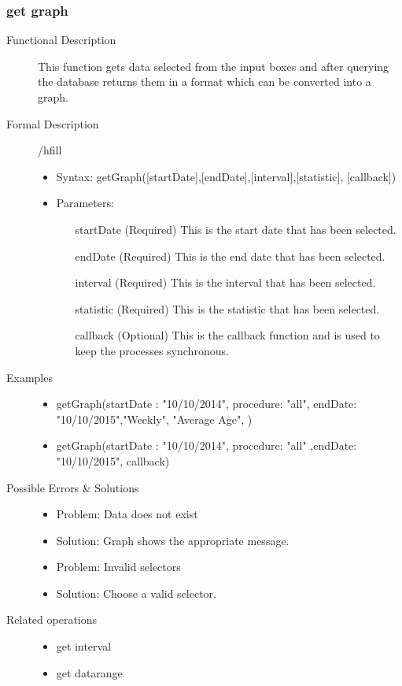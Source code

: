 \documentclass[14pt, a4paper]{article}
\begin{document}
\subsubsection{get graph}

\begin{description}
\item[Functional Description] This function gets data selected from the input boxes and after querying the database returns them in a format which can be converted into a graph.
\item[Formal Description]/hfill
\begin{itemize}
	\item Syntax: getGraph([startDate],[endDate],[interval],[statistic], [callback])\\
	\item Parameters:
		\begin{itemize}
			\item [startDate](Required) This is the start date that has been selected.
			\item [endDate](Required) This is the end date that has been selected.
			\item [interval](Required) This is the interval that has been selected.
			\item [statistic](Required) This is the statistic that has been selected.
			\item [callback](Optional) This is the callback function and is used to keep the processes synchronous.
		\end{itemize}
\end{itemize}
\item[Examples]\hfill
\begin{itemize}
	\item getGraph({startDate : "10/10/2014", procedure: "all", endDate: "10/10/2015"},"Weekly", "Average Age", )
	\item getGraph({startDate : "10/10/2014", procedure: "all" ,endDate: "10/10/2015"}, callback)
\end{itemize}
\item[Possible Errors \& Solutions]
\begin{itemize}
	\item Problem: Data does not exist
	\item Solution: Graph shows the appropriate message.
	\item Problem: Invalid selectors
	\item Solution: Choose a valid selector.
\end{itemize}
\item[Related operations] \hfill
\begin{itemize}
	\item get interval
	\item get datarange
\end{itemize}
\end{description}
\end{document}
